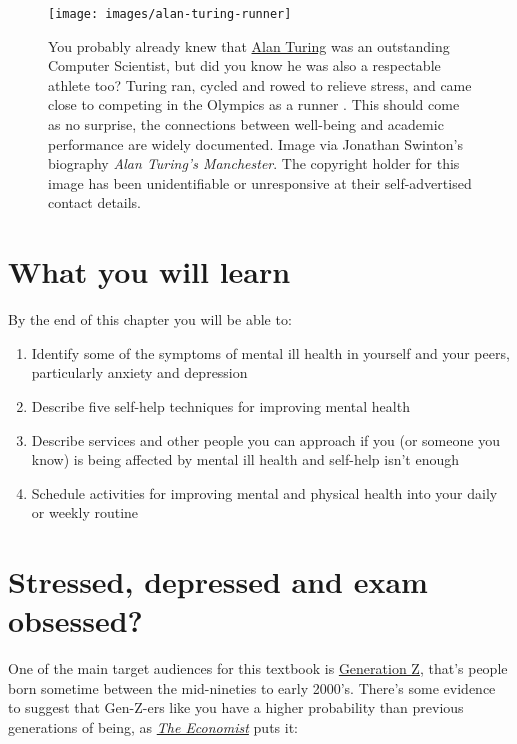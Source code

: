 \documentclass[
]{book}
\providecommand{\tightlist}{%
  \setlength{\itemsep}{0pt}\setlength{\parskip}{0pt}}
\begin{document}
\begin{figure}

{\centering \texttt{[image: images/alan-turing-runner]} 

}

\caption{You probably already knew that \href{https://en.wikipedia.org/wiki/Alan_Turing}{Alan Turing} was an outstanding Computer Scientist, but did you know he was also a respectable athlete too? Turing ran, cycled and rowed to relieve stress, and came close to competing in the Olympics as a runner \citep{kottke}. This should come as no surprise, the connections between well-being and academic performance are widely documented. Image via Jonathan Swinton's biography \emph{Alan Turing's Manchester}. \citep{manturing} The copyright holder for this image has been unidentifiable or unresponsive at their self-advertised contact details.}\label{fig:turing-fig}
\end{figure}



\hypertarget{ilo3}{%
\section{What you will learn}\label{ilo3}}

By the end of this chapter you will be able to:

\begin{enumerate}
\def\labelenumi{\arabic{enumi}.}
\tightlist
\item
  Identify some of the symptoms of mental ill health in yourself and your peers, particularly anxiety and depression
\item
  Describe five self-help techniques for improving mental health
\item
  Describe services and other people you can approach if you (or someone you know) is being affected by mental ill health and self-help isn't enough
\item
  Schedule activities for improving mental and physical health into your daily or weekly routine
\end{enumerate}

\hypertarget{genz}{%
\section{Stressed, depressed and exam obsessed?}\label{genz}}

One of the main target audiences for this textbook is \href{https://en.wikipedia.org/wiki/Generation_Z}{Generation Z}, that's people born sometime between the mid-nineties to early 2000's. There's some evidence to suggest that Gen-Z-ers like you have a higher probability than previous generations of being, as \emph{\href{https://en.wikipedia.org/wiki/The_Economist}{The Economist}} puts it:
\end{document}
